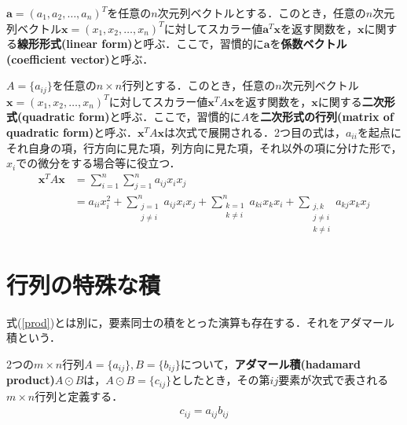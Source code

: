 \begin{defi}[線形形式]
${\bm a}=(a_1,a_2,\ldots,a_n)^T$を任意の$n$次元列ベクトルとする．このとき，任意の$n$次元列ベクトル${\bm x}=(x_1,x_2,\ldots,x_n)^T$に対してスカラー値${\bm a}^T{\bm x}$を返す関数を，${\bm x}$に関する{\bf 線形形式(linear form)}と呼ぶ．ここで，習慣的に${\bm a}$を{\bf 係数ベクトル(coefficient vector)}と呼ぶ．
\end{defi}

\begin{defi}[二次形式]
$A=\{a_{ij}\}$を任意の$n\times n$行列とする．このとき，任意の$n$次元列ベクトル${\bm x}=(x_1,x_2,\ldots,x_n)^T$に対してスカラー値${\bm x}^TA{\bm x}$を返す関数を，${\bm x}$に関する{\bf 二次形式(quadratic form)}と呼ぶ．ここで，習慣的に$A$を{\bf 二次形式の行列(matrix of quadratic form)}と呼ぶ．${\bm x}^TA{\bm x}$は次式で展開される．2つ目の式は，$a_{ii}$を起点にそれ自身の項，行方向に見た項，列方向に見た項，それ以外の項に分けた形で，$x_i$での微分をする場合等に役立つ．
\begin{align}
{\bm x}^TA{\bm x}&= \sum_{i=1}^n\sum_{j=1}^n a_{ij}x_ix_j\\
&=a_{ii}x_i^2+\sum_{\substack{j=1\\j\neq i}}^n a_{ij}x_ix_j+\sum_{\substack{k=1\\k\neq i}}^n a_{ki}x_kx_i+\sum_{\substack{j,k\\j\neq i\\k\neq i}}a_{kj}x_kx_j \label{quadform}
\end{align}
\end{defi}

\section{行列の特殊な積}

式(\ref{prod})とは別に，要素同士の積をとった演算も存在する．それをアダマール積という．

\begin{defi}[アダマール積]
2つの$m\times n$行列$A=\{a_{ij}\}, B=\{b_{ij}\}$について，{\bf アダマール積(hadamard product)}$A\odot B$は，$A\odot B=\{c_{ij}\}$としたとき，その第$ij$要素が次式で表される$m\times n$行列と定義する．
\begin{align}
c_{ij}=a_{ij}b_{ij}
\end{align}
\end{defi}

